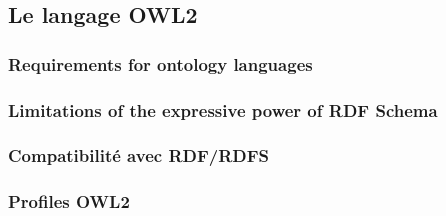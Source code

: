 \subsection{Le langage OWL2}
\label{sec:semantic-web-owl2-syntax-semantics}
\cite{motik2009owl}

\subsubsection{Requirements for ontology languages}
\label{sec:semantic-web-owl2-requirements}

\subsubsection{Limitations of the expressive power of RDF Schema}
\label{sec:semantic-web-owl2-rdfs-limitaions}


\subsubsection{Compatibilité avec RDF/RDFS}
\label{sec:semantic-web-owl2-rdfs-compatibility}

\subsubsection{Profiles OWL2}
\label{sec:semantic-web-owl2-semantics}

